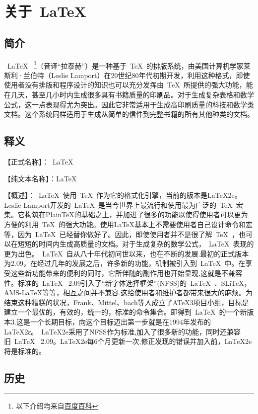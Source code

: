 \chapter{关于~\LaTeX{}~}
\label{chap:introduction}
\section{简介}
~\LaTeX{}~ \footnote{以下介绍均来自\href{http://baike.baidu.com/link?url=lUEyKcwLy5H-qEgRZlHI2H1aLND2Yd2x8vuTfJhXNq3Y5qhDc3oxRzANR0WUyI5A8qohsqrtoE0a02I20xcena}{百度百科}}（音译“拉泰赫”）是一种基于~\TeX{}~的排版系统，由美国计算机学家莱斯利·兰伯特（Leslie Lamport）在20世纪80年代初期开发，利用这种格式，即使使用者没有排版和程序设计的知识也可以充分发挥由~\TeX{}~所提供的强大功能，能在几天，甚至几小时内生成很多具有书籍质量的印刷品。对于生成复杂表格和数学公式，这一点表现得尤为突出。因此它非常适用于生成高印刷质量的科技和数学类文档。这个系统同样适用于生成从简单的信件到完整书籍的所有其他种类的文档。
\section{释义}
【正式名称】：~\LaTeX{}~


【纯文本名称】：LaTeX


【概述】：~\LaTeX{}~使用~\TeX{}~作为它的格式化引擎，当前的版本是LaTeX2e。Leslie Lamport开发的~\LaTeX{}~是当今世界上最流行和使用最为广泛的~\TeX{}~宏集。它构筑在PlainTeX的基础之上，并加进了很多的功能以使得使用者可以更为方便的利用~\TeX{}~的强大功能。使用LaTeX基本上不需要使用者自己设计命令和宏等，因为~\LaTeX{}~已经替你做好了。因此，即使使用者并不是很了解~\TeX{}~，也可以在短短的时间内生成高质量的文档。对于生成复杂的数学公式，~\LaTeX{}~表现的更为出色。~\LaTeX{}~自从八十年代初问世以来，也在不断的发展.最初的正式版本为2.09，在经过几年的发展之后，许多新的功能，机制被引入到~\LaTeX{}~中。在享受这些新功能带来的便利的同时，它所伴随的副作用也开始显现,这就是不兼容性。标准的~\LaTeX{}~ 2.09引入了“新字体选择框架”(NFSS)的~\LaTeX{}~、SLiTeX，AMS-LaTeX等等，相互之间并不兼容.这给使用者和维护者都带来很大的麻烦。为结束这种糟糕的状况，Frank、Mittel、bach等人成立了ATeX3项目小组，目标是建立一个最优的，有效的，统一的，标准的命令集合。即得到~\LaTeX{}~的一个新版本3.这是一个长期目标，向这个目标迈出第一步就是在1994年发布的LaTeX2ε。~LaTeX2e采用了NFSS作为标准,加入了很多新的功能，同时还兼容旧~\LaTeX{}~ 2.09。LaTeX2e每6个月更新一次,修正发现的错误并加入前，LaTeX2e将是标准的。
\section{历史}
